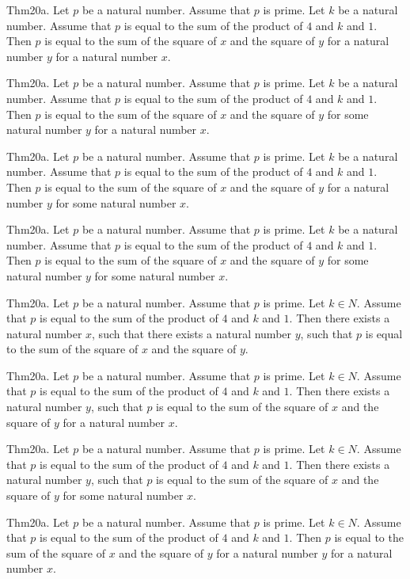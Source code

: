 \documentclass{article}
\begin{document}
Thm20a. Let $p$ be a natural number. Assume that $p$ is prime. Let $k$ be a natural number. Assume that $p$ is equal to the sum of the product of $4$ and $k$ and $1$. Then $p$ is equal to the sum of the square of $x$ and the square of $y$ for a natural number $y$ for a natural number $x$.

Thm20a. Let $p$ be a natural number. Assume that $p$ is prime. Let $k$ be a natural number. Assume that $p$ is equal to the sum of the product of $4$ and $k$ and $1$. Then $p$ is equal to the sum of the square of $x$ and the square of $y$ for some natural number $y$ for a natural number $x$.

Thm20a. Let $p$ be a natural number. Assume that $p$ is prime. Let $k$ be a natural number. Assume that $p$ is equal to the sum of the product of $4$ and $k$ and $1$. Then $p$ is equal to the sum of the square of $x$ and the square of $y$ for a natural number $y$ for some natural number $x$.

Thm20a. Let $p$ be a natural number. Assume that $p$ is prime. Let $k$ be a natural number. Assume that $p$ is equal to the sum of the product of $4$ and $k$ and $1$. Then $p$ is equal to the sum of the square of $x$ and the square of $y$ for some natural number $y$ for some natural number $x$.

Thm20a. Let $p$ be a natural number. Assume that $p$ is prime. Let $k \in N$. Assume that $p$ is equal to the sum of the product of $4$ and $k$ and $1$. Then there exists a natural number $x$, such that there exists a natural number $y$, such that $p$ is equal to the sum of the square of $x$ and the square of $y$.

Thm20a. Let $p$ be a natural number. Assume that $p$ is prime. Let $k \in N$. Assume that $p$ is equal to the sum of the product of $4$ and $k$ and $1$. Then there exists a natural number $y$, such that $p$ is equal to the sum of the square of $x$ and the square of $y$ for a natural number $x$.

Thm20a. Let $p$ be a natural number. Assume that $p$ is prime. Let $k \in N$. Assume that $p$ is equal to the sum of the product of $4$ and $k$ and $1$. Then there exists a natural number $y$, such that $p$ is equal to the sum of the square of $x$ and the square of $y$ for some natural number $x$.

Thm20a. Let $p$ be a natural number. Assume that $p$ is prime. Let $k \in N$. Assume that $p$ is equal to the sum of the product of $4$ and $k$ and $1$. Then $p$ is equal to the sum of the square of $x$ and the square of $y$ for a natural number $y$ for a natural number $x$.
\end{document}
